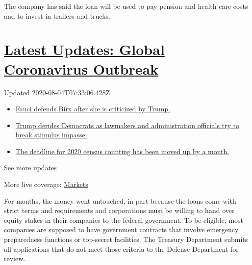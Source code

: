 The company has said the loan will be used to pay pension and health
care costs and to invest in trailers and trucks.

\hypertarget{latest-updates-global-coronavirus-outbreak}{%
\section{\texorpdfstring{\href{https://www.nytimes.com/2020/08/03/world/coronavirus-covid-19.html?action=click\&pgtype=Article\&state=default\&region=MAIN_CONTENT_1\&context=storylines_live_updates}{Latest
Updates: Global Coronavirus
Outbreak}}{Latest Updates: Global Coronavirus Outbreak}}\label{latest-updates-global-coronavirus-outbreak}}

Updated 2020-08-04T07:33:06.428Z

\begin{itemize}
\tightlist
\item
  \href{https://www.nytimes.com/2020/08/03/world/coronavirus-covid-19.html?action=click\&pgtype=Article\&state=default\&region=MAIN_CONTENT_1\&context=storylines_live_updates\#link-4547638f}{Fauci
  defends Birx after she is criticized by Trump.}
\item
  \href{https://www.nytimes.com/2020/08/03/world/coronavirus-covid-19.html?action=click\&pgtype=Article\&state=default\&region=MAIN_CONTENT_1\&context=storylines_live_updates\#link-15e7f995}{Trump
  derides Democrats as lawmakers and administration officials try to
  break stimulus impasse.}
\item
  \href{https://www.nytimes.com/2020/08/03/world/coronavirus-covid-19.html?action=click\&pgtype=Article\&state=default\&region=MAIN_CONTENT_1\&context=storylines_live_updates\#link-e5a2cda}{The
  deadline for 2020 census counting has been moved up by a month.}
\end{itemize}

\href{https://www.nytimes.com/2020/08/03/world/coronavirus-covid-19.html?action=click\&pgtype=Article\&state=default\&region=MAIN_CONTENT_1\&context=storylines_live_updates}{See
more updates}

More live coverage:
\href{https://www.nytimes.com/live/2020/08/03/business/stock-market-today-coronavirus?action=click\&pgtype=Article\&state=default\&region=MAIN_CONTENT_1\&context=storylines_live_updates}{Markets}

For months, the money went untouched, in part because the loans come
with strict terms and requirements and corporations must be willing to
hand over equity stakes in their companies to the federal government. To
be eligible, most companies are supposed to have government contracts
that involve emergency preparedness functions or top-secret facilities.
The Treasury Department submits all applications that do not meet those
criteria to the Defense Department for review.

